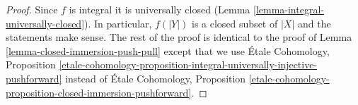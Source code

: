 \begin{proof}
Since $f$ is integral it is universally closed
(Lemma \ref{lemma-integral-universally-closed}).
In particular, $f(|Y|)$ is a closed subset of $|X|$
and the statements make sense.
The rest of the proof is identical to the proof of
Lemma \ref{lemma-closed-immersion-push-pull}
except that we use
\'Etale Cohomology, Proposition
\ref{etale-cohomology-proposition-integral-universally-injective-pushforward}
instead of
\'Etale Cohomology, Proposition
\ref{etale-cohomology-proposition-closed-immersion-pushforward}.
\end{proof}





























